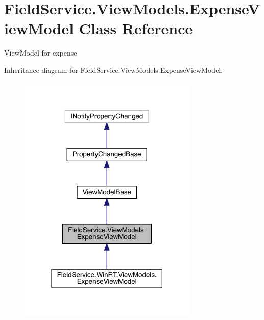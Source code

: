 \hypertarget{class_field_service_1_1_view_models_1_1_expense_view_model}{\section{Field\+Service.\+View\+Models.\+Expense\+View\+Model Class Reference}
\label{class_field_service_1_1_view_models_1_1_expense_view_model}
}


View\+Model for expense  




Inheritance diagram for Field\+Service.\+View\+Models.\+Expense\+View\+Model\+:
\nopagebreak
\begin{figure}[H]
\begin{center}
\leavevmode
\includegraphics[width=242pt]{class_field_service_1_1_view_models_1_1_expense_view_model__inherit__graph}
\end{center}
\end{figure}


